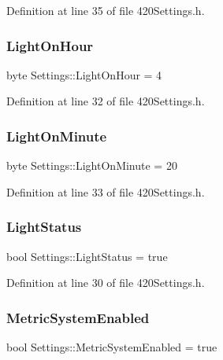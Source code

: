 Definition at line 35 of file 420\+Settings.\+h.

\mbox{\label{struct_settings_a986d09e94dfbff4c6ba717d3cc51a076}} 
\subsubsection{\texorpdfstring{LightOnHour}{LightOnHour}}
{\footnotesize\ttfamily byte Settings\+::\+Light\+On\+Hour = 4}



Definition at line 32 of file 420\+Settings.\+h.

\mbox{\label{struct_settings_adc2a7db089da15debb65c7e6e457f09e}} 
\subsubsection{\texorpdfstring{LightOnMinute}{LightOnMinute}}
{\footnotesize\ttfamily byte Settings\+::\+Light\+On\+Minute = 20}



Definition at line 33 of file 420\+Settings.\+h.

\mbox{\label{struct_settings_a13f588dbe3cb994d58c32aa44e894625}} 
\subsubsection{\texorpdfstring{LightStatus}{LightStatus}}
{\footnotesize\ttfamily bool Settings\+::\+Light\+Status = true}



Definition at line 30 of file 420\+Settings.\+h.

\mbox{\label{struct_settings_a4879a55e1688318b681f67d40100f768}} 
\subsubsection{\texorpdfstring{MetricSystemEnabled}{MetricSystemEnabled}}
{\footnotesize\ttfamily bool Settings\+::\+Metric\+System\+Enabled = true}



